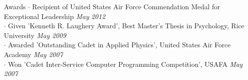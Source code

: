 
\begin{rSection}{Awards}
  $\cdot$ Recipient of United States Air Force Commendation Medal for Exceptional Leadership 
  \hfill {\em May 2012} \\
  $\cdot$ Given 'Kenneth R. Laughery Award', Best Master’s Thesis in Psychology, Rice University 
  \hfill {\em May 2009} \\
  $\cdot$ Awarded 'Outstanding Cadet in Applied Physics', United States Air Force Academy 
  \hfill {\em May 2007} \\
  $\cdot$ Won 'Cadet Inter-Service Computer Programming Competition', USAFA 
  \hfill {\em May 2007}
\end{rSection}
